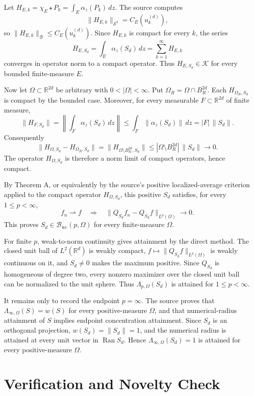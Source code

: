 \documentclass[11pt]{amsart}
\newcommand{\R}{\mathbb R}
\newcommand{\cB}{\mathcal B}
\newcommand{\cK}{\mathcal K}
\newcommand{\wc}{\mathrm{wc}}
\newcommand{\dd}{\,d}
\begin{document}
Let \(H_{E,k}=\chi_E\star P_k=\int_E\alpha_z(P_k)\dd z\).  The source computes
\[
\|H_{E,k}\|_{\mathcal S^2}=C_E(u_k^{(d)}),
\]
so \(\|H_{E,k}\|_{\cB}\le C_E(u_k^{(d)})\).  Since \(H_{E,k}\) is compact for every \(k\), the series
\[
H_{E,S_d}=\int_E\alpha_z(S_d)\dd z=\sum_{k=1}^\infty H_{E,k}
\]
converges in operator norm to a compact operator.  Thus \(H_{E,S_d}\in\cK\) for every bounded finite-measure \(E\).

Now let \(\Omega\subset\R^{2d}\) be arbitrary with \(0<|\Omega|<\infty\).  Put \(\Omega_R=\Omega\cap B_R^{2d}\).  Each \(H_{\Omega_R,S_d}\) is compact by the bounded case.  Moreover, for every measurable \(F\subset\R^{2d}\) of finite measure,
\[
\|H_{F,S_d}\|
=\left\|\int_F\alpha_z(S_d)\dd z\right\|
\le \int_F\|\alpha_z(S_d)\|\dd z
=|F|\,\|S_d\| .
\]
Consequently
\[
\|H_{\Omega,S_d}-H_{\Omega_R,S_d}\|
=\|H_{\Omega\setminus B_R^{2d},S_d}\|
\le |\Omega\setminus B_R^{2d}|\,\|S_d\|\longrightarrow0 .
\]
The operator \(H_{\Omega,S_d}\) is therefore a norm limit of compact operators, hence compact.

By Theorem A, or equivalently by the source's positive localized-average criterion applied to the compact operator \(H_{\Omega,S_d}\), this positive \(S_d\) satisfies, for every \(1\le p<\infty\),
\[
f_n\rightharpoonup f
\quad\Longrightarrow\quad
\|Q_{S_d}f_n-Q_{S_d}f\|_{L^p(\Omega)}\to0 .
\]
This proves \(S_d\in\cB_{\wc}(p,\Omega)\) for every finite-measure \(\Omega\).

For finite \(p\), weak-to-norm continuity gives attainment by the direct method.  The closed unit ball of \(L^2(\R^d)\) is weakly compact, \(f\mapsto\|Q_{S_d}f\|_{L^p(\Omega)}\) is weakly continuous on it, and \(S_d\ne0\) makes the maximum positive.  Since \(Q_{S_d}\) is homogeneous of degree two, every nonzero maximizer over the closed unit ball can be normalized to the unit sphere.  Thus \(\Lambda_{p,\Omega}(S_d)\) is attained for \(1\le p<\infty\).

It remains only to record the endpoint \(p=\infty\).  The source proves that \(\Lambda_{\infty,\Omega}(S)=w(S)\) for every positive-measure \(\Omega\), and that numerical-radius attainment of \(S\) implies endpoint concentration attainment.  Since \(S_d\) is an orthogonal projection, \(w(S_d)=\|S_d\|=1\), and the numerical radius is attained at every unit vector in \(\operatorname{Ran}S_d\).  Hence \(\Lambda_{\infty,\Omega}(S_d)=1\) is attained for every positive-measure \(\Omega\).

\section*{Verification and Novelty Check}
\end{document}
